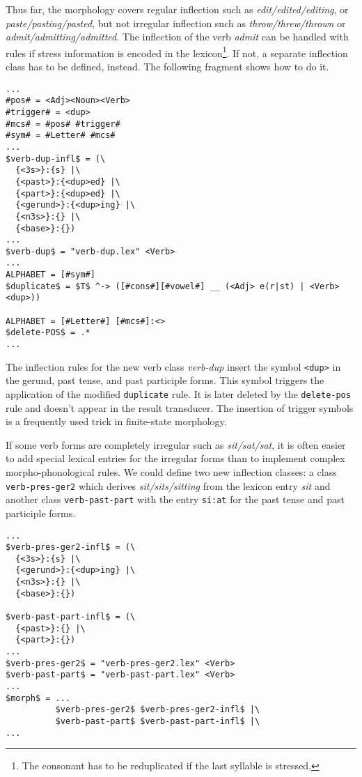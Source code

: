 \documentclass[11pt]{article}
\begin{document}
Thus far, the morphology covers regular inflection such as
\emph{edit/edited/editing}, or \emph{paste/pasting/pasted}, but not
irregular inflection such as \emph{throw/threw/thrown} or
\emph{admit/admitting/admitted}. The inflection of the verb
\emph{admit} can be handled with rules if stress information is
encoded in the lexicon\footnote{The consonant has to be reduplicated
  if the last syllable is stressed.}. If not, a separate inflection
class has to be defined, instead. The following fragment shows how to
do it.

\begin{verbatim}
...
#pos# = <Adj><Noun><Verb>
#trigger# = <dup>
#mcs# = #pos# #trigger#
#sym# = #Letter# #mcs#
...
$verb-dup-infl$ = (\
  {<3s>}:{s} |\
  {<past>}:{<dup>ed} |\
  {<part>}:{<dup>ed} |\
  {<gerund>}:{<dup>ing} |\
  {<n3s>}:{} |\
  {<base>}:{})
...
$verb-dup$ = "verb-dup.lex" <Verb>
...
ALPHABET = [#sym#]
$duplicate$ = $T$ ^-> ([#cons#][#vowel#] __ (<Adj> e(r|st) | <Verb><dup>))

ALPHABET = [#Letter#] [#mcs#]:<>
$delete-POS$ = .*
...
\end{verbatim}

The inflection rules for the new verb class \emph{verb-dup} insert the
symbol \texttt{<dup>} in the gerund, past tense, and past participle
forms. This symbol triggers the application of the modified
\texttt{duplicate} rule. It is later deleted by the
\texttt{delete-pos} rule and doesn't appear in the result transducer.
The insertion of trigger symbols is a frequently used trick in
finite-state morphology.

If some verb forms are completely irregular such as
\emph{sit/sat/sat}, it is often easier to add special lexical
entries for the irregular forms than to implement complex
morpho-phonological rules. We could define two new inflection classes:
a class \texttt{verb-pres-ger2} which derives \emph{sit/sits/sitting}
from the lexicon entry \emph{sit} and another class
\texttt{verb-past-part} with the entry \texttt{si:at} for the past
tense and past participle forms.

\begin{verbatim}
...
$verb-pres-ger2-infl$ = (\
  {<3s>}:{s} |\
  {<gerund>}:{<dup>ing} |\
  {<n3s>}:{} |\
  {<base>}:{})

$verb-past-part-infl$ = (\
  {<past>}:{} |\
  {<part>}:{})
...
$verb-pres-ger2$ = "verb-pres-ger2.lex" <Verb>
$verb-past-part$ = "verb-past-part.lex" <Verb>
...
$morph$ = ...
          $verb-pres-ger2$ $verb-pres-ger2-infl$ |\
          $verb-past-part$ $verb-past-part-infl$ |\
...
\end{verbatim}
\end{document}
